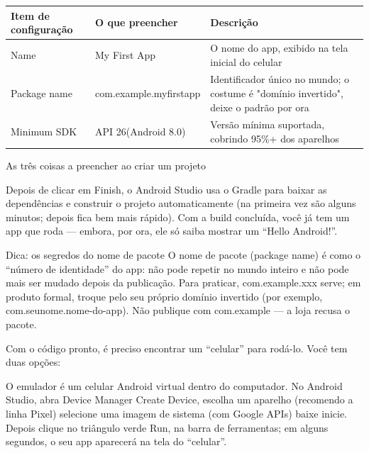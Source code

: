 \begin{center}
\begin{tabularx}{\linewidth}{|X|X|X|}
\hline
\textbf{Item de configuração} & \textbf{O que preencher} & \textbf{Descrição} \tabularnewline
\hline
Name & My First App & O nome do app, exibido na tela inicial do celular \tabularnewline
Package name & com.example.myfirstapp & Identificador único no mundo; o costume é "domínio invertido", deixe o padrão por ora \tabularnewline
Minimum SDK & API 26(Android 8.0) & Versão mínima suportada, cobrindo 95\%+ dos aparelhos \tabularnewline
\hline
\end{tabularx}
\end{center}

\begin{center}\small\color{gray}As três coisas a preencher ao criar um projeto\end{center}

Depois de clicar em Finish, o Android Studio usa o Gradle para baixar as dependências e construir o projeto automaticamente (na primeira vez são alguns minutos; depois fica bem mais rápido). Com a build concluída, você já tem um app que roda — embora, por ora, ele só saiba mostrar um “Hello Android!”.

\begin{tcbinfo}{Dica: os segredos do nome de pacote}
O nome de pacote (package name) é como o “número de identidade” do app: não pode repetir no mundo inteiro e não pode mais ser mudado depois da publicação. Para praticar, com.example.xxx serve; em produto formal, troque pelo seu próprio domínio invertido (por exemplo, com.seunome.nome-do-app). Não publique com com.example — a loja recusa o pacote.

\end{tcbinfo}


Com o código pronto, é preciso encontrar um “celular” para rodá-lo. Você tem duas opções:


O emulador é um celular Android virtual dentro do computador. No Android Studio, abra Device Manager Create Device, escolha um aparelho (recomendo a linha Pixel) selecione uma imagem de sistema (com Google APIs) baixe inicie. Depois clique no triângulo verde Run, na barra de ferramentas; em alguns segundos, o seu app aparecerá na tela do “celular”.


